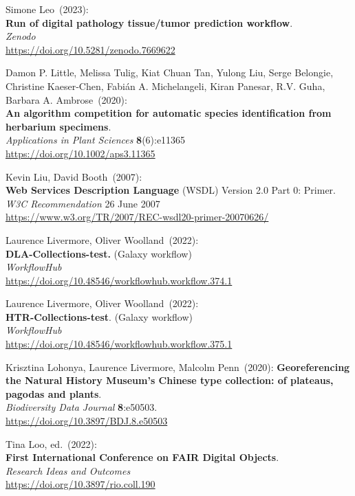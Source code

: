 \begin{thebibliography}{9}
Simone Leo~(2023): \\
\textbf{Run of digital pathology tissue/tumor prediction workflow}.\\
\emph{Zenodo}\\
\url{https://doi.org/10.5281/zenodo.7669622}

Damon P. Little, Melissa Tulig, Kiat Chuan Tan, Yulong Liu, Serge Belongie, Christine Kaeser‐Chen, Fabián A. Michelangeli, Kiran Panesar, R.V. Guha, Barbara A. Ambrose~(2020): \\
\textbf{An algorithm competition for automatic species identification from herbarium specimens}.\\
\emph{Applications in Plant Sciences} \textbf{8}(6):e11365\\
\url{https://doi.org/10.1002/aps3.11365}

Kevin Liu, David Booth~(2007): \\
\textbf{Web Services Description Language} (WSDL) Version 2.0
Part 0: Primer. \\
\emph{W3C Recommendation} 26 June 2007 \\
\url{https://www.w3.org/TR/2007/REC-wsdl20-primer-20070626/}

Laurence Livermore, Oliver Woolland~(2022): \\
\textbf{DLA-Collections-test.} (Galaxy workflow)\\
\emph{WorkflowHub}\\
\url{https://doi.org/10.48546/workflowhub.workflow.374.1}

Laurence Livermore, Oliver Woolland~(2022): \\
\textbf{HTR-Collections-test}. (Galaxy workflow)\\
\emph{WorkflowHub}\\
\url{https://doi.org/10.48546/workflowhub.workflow.375.1}

Krisztina Lohonya, Laurence Livermore, Malcolm Penn~(2020):
\textbf{Georeferencing the Natural History Museum's Chinese type collection: of plateaus,
pagodas and plants}.\\
\emph{Biodiversity Data Journal} \textbf{8}:e50503.\\
\url{https://doi.org/10.3897/BDJ.8.e50503}


Tina Loo, ed.~(2022): \\
\textbf{First International Conference on FAIR Digital Objects}.\\
\emph{Research Ideas and Outcomes}\\
\url{https://doi.org/10.3897/rio.coll.190}


\end{thebibliography}
